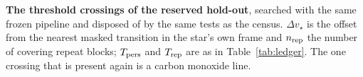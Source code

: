 \begin{table}
\centering
\caption{\textbf{The threshold crossings of the reserved hold-out}, searched
with the same frozen pipeline and disposed of by the same tests as the
census. $\Delta v_\star$ is the offset from the nearest masked transition in
the star's own frame and $n_{\rm rep}$ the number of covering repeat blocks;
$T_{\rm pers}$ and $T_{\rm rep}$ are as in Table~\ref{tab:ledger}. The one
crossing that is present again is a carbon monoxide line.}
\label{tab:holdout}
\scriptsize

\end{table}





